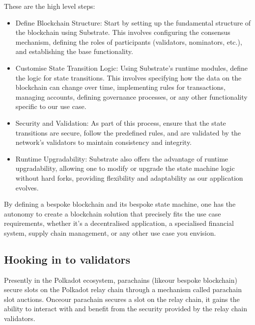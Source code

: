 \documentclass{tufte-handout}
\begin{document}
These are the high level steps:
\begin{itemize}
\item Define Blockchain Structure: Start by setting up the fundamental structure of the blockchain using Substrate. This involves configuring the consensus mechanism,
defining the roles of participants (validators, nominators, etc.), and establishing the base functionality.
\item Customise State Transition Logic: Using Substrate's runtime modules, define the logic for state transitions. This involves specifying how the data on the blockchain
can change over time, implementing rules for transactions, managing accounts, defining governance processes, or any other functionality specific to our use case.
\item Security and Validation: As part of this process, ensure that the state transitions are secure, follow the predefined rules, and are validated by the network's validators
to maintain consistency and integrity.
\item Runtime Upgradability: Substrate also offers the advantage of runtime upgradability, allowing one to modify or upgrade the state machine logic without hard forks, providing
flexibility and adaptability as our application evolves.
\end{itemize}
By defining a bespoke blockchain and its bespoke state machine, one has the autonomy to create a blockchain solution that precisely fits the use case requirements, whether it's a
decentralised application, a specialised financial system, supply chain management, or any other use case you envision.

\subsection{Hooking in to validators}\label{sec:headings}
Presently in the Polkadot ecosystem, parachains (likeour bespoke blockchain) secure slots on the Polkadot relay chain through a mechanism called parachain slot auctions. Onceour parachain
secures a slot on the relay chain, it gains the ability to interact with and benefit from the security provided by the relay chain validators.
\end{document}
